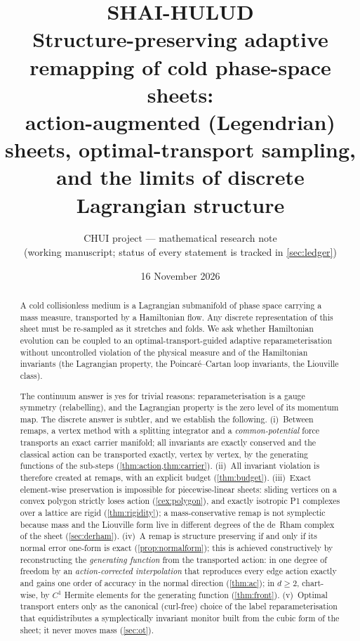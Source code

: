 \documentclass[11pt,a4paper]{article}
\title{\textbf{SHAI-HULUD}\\[2pt]
\large Structure-preserving adaptive remapping of cold phase-space sheets:\\
action-augmented (Legendrian) sheets, optimal-transport sampling,\\
and the limits of discrete Lagrangian structure}
\author{CHUI project --- mathematical research note\\
\small (working manuscript; status of every statement is tracked in \cref{sec:ledger})}
\date{16 November 2026}
\numberwithin{equation}{section}
\theoremstyle{definition}
\theoremstyle{remark}
\begin{document}
\maketitle

\begin{abstract}
A cold collisionless medium is a Lagrangian submanifold of phase space carrying a mass measure, transported by a
Hamiltonian flow. Any discrete representation of this sheet must be re-sampled as it stretches and folds. We ask
whether Hamiltonian evolution can be coupled to an optimal-transport-guided adaptive reparameterisation without
uncontrolled violation of the physical measure and of the Hamiltonian invariants (the Lagrangian property, the
Poincar\'e--Cartan loop invariants, the Liouville class).

The continuum answer is yes for trivial reasons: reparameterisation is a gauge symmetry (relabelling), and the
Lagrangian property is the zero level of its momentum map. The discrete answer is subtler, and we establish the
following. (i)~Between remaps, a vertex method with a splitting integrator and a \emph{common-potential} force
transports an exact carrier manifold; all invariants are exactly conserved and the classical action can be
transported exactly, vertex by vertex, by the generating functions of the sub-steps (\cref{thm:action,thm:carrier}).
(ii)~All invariant violation is therefore created at remaps, with an explicit budget (\cref{thm:budget}).
(iii)~Exact element-wise preservation is impossible for piecewise-linear sheets: sliding vertices on a convex
polygon strictly loses action (\cref{cex:polygon}), and exactly isotropic P1 complexes over a lattice are rigid
(\cref{thm:rigidity}); a mass-conservative remap is not symplectic because mass and the Liouville form live in
different degrees of the de~Rham complex of the sheet (\cref{sec:derham}). (iv)~A remap is structure preserving
if and only if its normal error one-form is exact (\cref{prop:normalform}); this is achieved constructively by
reconstructing the \emph{generating function} from the transported action: in one degree of freedom by an
\emph{action-corrected interpolation} that reproduces every edge action exactly and gains one order of accuracy
in the normal direction (\cref{thm:ac}); in $d\ge 2$, chart-wise, by $C^1$ Hermite elements for the generating
function (\cref{thm:front}). (v)~Optimal transport enters only as the canonical (curl-free) choice of the label
reparameterisation that equidistributes a symplectically invariant monitor built from the cubic form of the
sheet; it never moves mass (\cref{sec:ot}).


\end{abstract}
\end{document}
